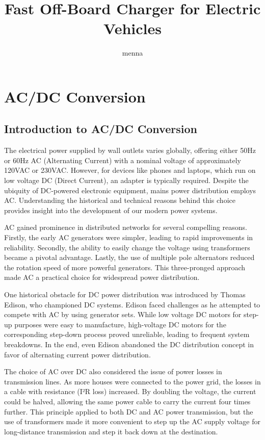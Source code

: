 \documentclass[12pt,a4paper]{book}
\author{menna}
\title{Fast Off-Board Charger for Electric Vehicles}
\begin{document}
\maketitle
\setcounter{tocdepth}{3}
\tableofcontents
\listoffigures
\listoftables

\part{AC/DC Conversion}

\chapter{Introduction to AC/DC Conversion}
The electrical power supplied by wall outlets varies globally, offering either 50Hz or 60Hz AC (Alternating Current) with a nominal voltage of approximately 120VAC or 230VAC. However, for devices like phones and laptops, which run on low voltage DC (Direct Current), an adapter is typically required. Despite the ubiquity of DC-powered electronic equipment, mains power distribution employs AC. Understanding the historical and technical reasons behind this choice provides insight into the development of our modern power systems.

AC gained prominence in distributed networks for several compelling reasons. Firstly, the early AC generators were simpler, leading to rapid improvements in reliability. Secondly, the ability to easily change the voltage using transformers became a pivotal advantage. Lastly, the use of multiple pole alternators reduced the rotation speed of more powerful generators. This three-pronged approach made AC a practical choice for widespread power distribution.

One historical obstacle for DC power distribution was introduced by Thomas Edison, who championed DC systems. Edison faced challenges as he attempted to compete with AC by using generator sets. While low voltage DC motors for step-up purposes were easy to manufacture, high-voltage DC motors for the corresponding step-down process proved unreliable, leading to frequent system breakdowns. In the end, even Edison abandoned the DC distribution concept in favor of alternating current power distribution\cite{acdc2018}.

The choice of AC over DC also considered the issue of power losses in transmission lines. As more houses were connected to the power grid, the losses in a cable with resistance (I²R loss) increased. By doubling the voltage, the current could be halved, allowing the same power cable to carry the current four times further. This principle applied to both DC and AC power transmission, but the use of transformers made it more convenient to step up the AC supply voltage for long-distance transmission and step it back down at the destination.
\end{document}
